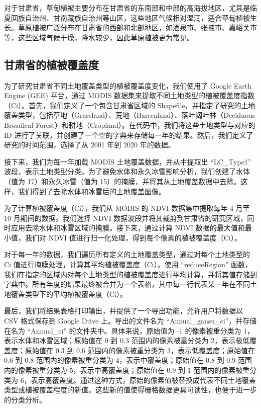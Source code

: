 \documentclass[AutoFakeBold]{LZUThesis-PgD&PhD}
\begin{document}
对于甘肃省，草甸植被主要分布在甘肃省的东南部和中部的高海拔地区，尤其是临夏回族自治州、甘南藏族自治州等山区，这些地区气候相对湿润，适合草甸植被生长。草原植被广泛分布在甘肃省的西部和北部地区，如酒泉市、张掖市、嘉峪关市等，这些区域气候干燥，降水较少，因此草原植被更为常见。

\subsection{甘肃省的植被覆盖度}

		为了研究甘肃省不同土地覆盖类型的植被覆盖度变化，我们使用了 Google Earth Engine (GEE) 平台，通过 MODIS 数据集来提取不同土地类型的植被覆盖度指数（Ci）。首先，我们定义了一个包含甘肃省区域的 Shapefile，并指定了研究的土地覆盖类型，包括草地（Grassland）、荒地（Barrenland）、落叶阔叶林（Deciduous Broadleaf Forest）和耕地（Cropland）。在代码中，我们将这些土地类型与对应的 ID 进行了关联，并创建了一个空的字典来存储每一年的结果。然后，我们定义了研究的时间范围，选择了从 2001 年到 2020 年的数据。
		
		接下来，我们为每一年加载 MODIS 土地覆盖数据，并从中提取出 ``LC\_Type1'' 波段，表示土地类型分类。为了避免水体和永久冰雪影响分析，我们创建了水体（值为 17）和永久冰雪（值为 15）的掩膜，并将其从土地覆盖数据中去除。这样，我们得到了去除水体和冰雪后的土地覆盖图像。
		
		为了计算植被覆盖度（Ci），我们从 MODIS 的 NDVI 数据集中提取每年 4 月至 10 月期间的数据。我们选择 NDVI 数据波段并将其裁剪到甘肃省的研究区域，同时应用去除水体和冰雪区域的掩膜。接下来，通过计算 NDVI 数据的最大值和最小值，我们对 NDVI 值进行归一化处理，得到每个像素的植被覆盖度（Ci）。
		
		对于每一年的数据，我们遍历所有定义的土地覆盖类型，通过对每个土地类型的 Ci 值进行掩膜处理，计算其平均植被覆盖度（Ci）。使用 ``reduceRegion'' 函数，我们在指定的区域内对每个土地类型的植被覆盖度进行平均计算，并将其值存储到字典中。所有年度的结果最终被合并为一个表格，其中每一行代表某一年在不同土地覆盖类型下的平均植被覆盖度（Ci）。
		
		最后，我们将结果表格打印输出，并提供了一个导出功能，允许用户将数据以 CSV 格式保存到 Google Drive 上。导出的文件名为 ``Annual\_gansu\_ci''，并存储在名为 ``Annual\_ci'' 的文件夹中。具体来说，原始值为 -1 的像素被重分类为 1，表示水体和冰雪区域；原始值在 0 到 0.3 范围内的像素被重分类为 2，表示极低覆盖度；原始值在 0.3 到 0.6 范围内的像素被重分类为 3，表示低覆盖度；原始值在 0.6 到 0.8 范围内的像素被重分类为 4，表示中覆盖度；原始值在 0.8 到 0.9 范围内的像素被重分类为 5，表示中高覆盖度；原始值在 0.9 到 1 范围内的像素被重分类为 6，表示高覆盖度。通过这种方式，原始的像素值被替换成代表不同土地覆盖类型或植被覆盖程度的新值。这些新的值使得栅格数据更具可读性，也便于进一步的分类分析。
\end{document}
